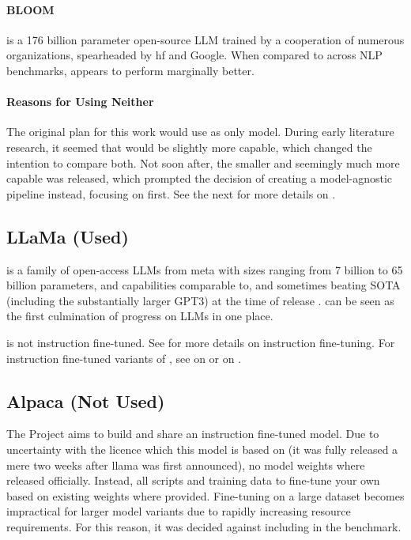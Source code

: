 \paragraph{BLOOM}\label{par:bloom}\label{sub:BLOOM}
 \cite{workshop_bloom_2022} is a 176 billion parameter open-source \gls{LLM} trained by a cooperation of numerous organizations, spearheaded by \gls{hf} and \gls{Google}. When compared to  across \gls{NLP} benchmarks,  appears to perform marginally better.

\paragraph{Reasons for Using Neither}
The original plan for this work would use  as only model. During early literature research, it seemed that  would be slightly more capable, which changed the intention to compare both.
Not soon after, the smaller and seemingly much more capable  was released, which prompted the decision of creating a model-agnostic pipeline instead, focusing on  first.
See the next  for more details on .

\subsection{LLaMa (Used)}\label{sub:llama}
 is a family of open-access \glspl{LLM} from \gls{meta} with sizes ranging from 7 billion to 65 billion parameters, and capabilities comparable to, and sometimes beating \gls{SOTA} (including the substantially larger \gls{GPT3}) at the time of release \cite{touvron_llama_2023}.
 can be seen as the first culmination of progress on \glspl{LLM} in one place.

 is not instruction fine-tuned. See  for more details on instruction fine-tuning.
For instruction fine-tuned variants of , see  on  or  on .

\subsection{Alpaca (Not Used)}\label{sub:alpaca}
The  Project \cite{tatsulab_2023} aims to build and share an instruction fine-tuned  model.
Due to uncertainty with the  licence which this model is based on (it was fully released a mere two weeks after \gls{llama} was first announced), no model weights where released officially.
Instead, all scripts and training data to fine-tune your own  based on existing  weights where provided.
Fine-tuning on a large dataset becomes impractical for larger model variants due to rapidly increasing resource requirements.
For this reason, it was decided against including  in the benchmark.


